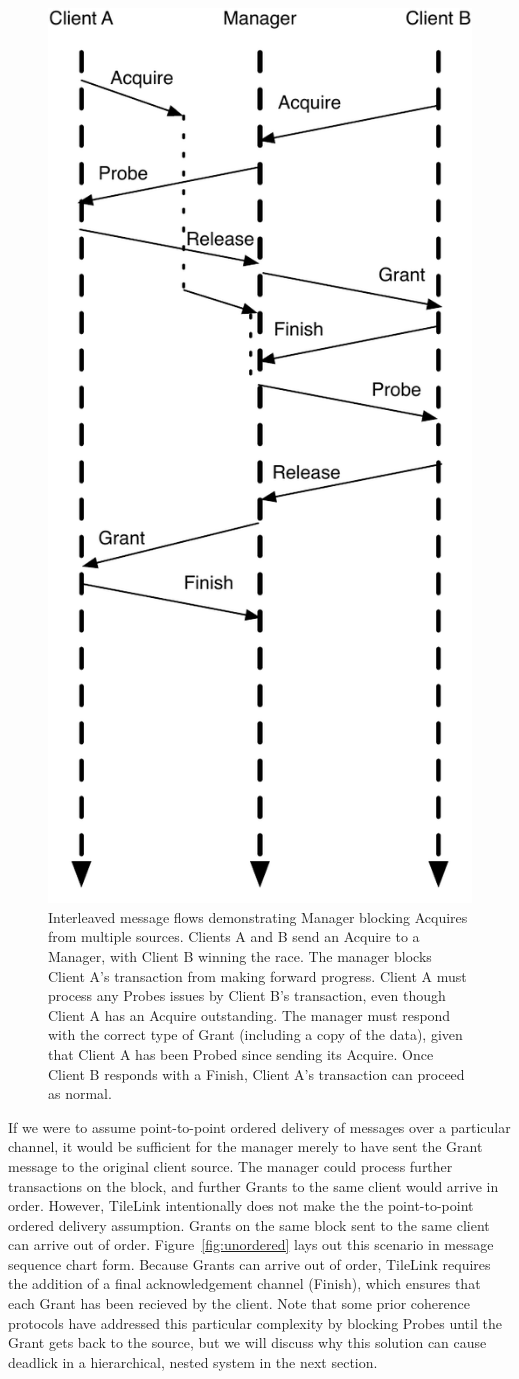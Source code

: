 \begin{figure}[t!]
\centering
\includegraphics[width=0.5\columnwidth]{tilelink/figures/ordered.pdf}
\caption{Interleaved message flows demonstrating Manager blocking Acquires from multiple sources.
Clients A and B send an Acquire to a Manager, with Client B winning the race.
The manager blocks Client A's transaction from making forward progress.
Client A must process any Probes issues by Client B's transaction, even though Client A has an Acquire outstanding.
The manager must respond with the correct type of Grant (including a copy of the data), given that Client A has been Probed since sending its Acquire.
Once Client B responds with a Finish, Client A's transaction can proceed as normal.
}
\label{fig:ordered}
\end{figure}

If we were to assume point-to-point ordered delivery of messages over a particular channel,
it would be sufficient for the manager merely to have sent the Grant message to the original client source.
The manager could process further transactions on the block, and further Grants to the same client would arrive in order.
However, TileLink intentionally does not make the the point-to-point ordered delivery assumption.
Grants on the same block sent to the same client can arrive out of order.
Figure~\ref{fig:unordered} lays out this scenario in message sequence chart form.
Because Grants can arrive out of order, TileLink requires the addition of a final acknowledgement channel (Finish), which ensures that each Grant has been recieved by the client.
Note that some prior coherence protocols have addressed this particular complexity by blocking Probes until the Grant gets back to the source, but we will discuss why this solution can
cause deadlick in a hierarchical, nested system in the next section.

